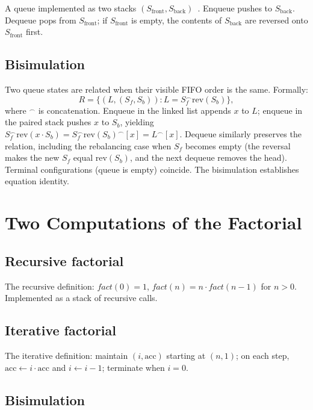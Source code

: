 \documentclass[twocolumn,11pt,a4paper]{article}
\begin{document}
A queue implemented as two stacks $(S_\mathrm{front}, S_\mathrm{back})$~\citep{hood1981queue}. Enqueue pushes to $S_\mathrm{back}$. Dequeue pops from $S_\mathrm{front}$; if $S_\mathrm{front}$ is empty, the contents of $S_\mathrm{back}$ are reversed onto $S_\mathrm{front}$ first.

\subsection{Bisimulation}

Two queue states are related when their visible FIFO order is the same. Formally:
\[
R = \{(L, (S_f, S_b)) : L = S_f ^\frown \mathrm{rev}(S_b)\},
\]
where $^\frown$ is concatenation. Enqueue in the linked list appends $x$ to $L$; enqueue in the paired stack pushes $x$ to $S_b$, yielding $S_f ^\frown \mathrm{rev}(x \cdot S_b) = S_f ^\frown \mathrm{rev}(S_b) ^\frown [x] = L ^\frown [x]$. Dequeue similarly preserves the relation, including the rebalancing case when $S_f$ becomes empty (the reversal makes the new $S_f$ equal $\mathrm{rev}(S_b)$, and the next dequeue removes the head). Terminal configurations (queue is empty) coincide. The bisimulation establishes equation identity.

\section{Two Computations of the Factorial}
\label{sec:factorial-example}

\subsection{Recursive factorial}

The recursive definition: $\mathit{fact}(0) = 1$, $\mathit{fact}(n) = n \cdot \mathit{fact}(n-1)$ for $n > 0$. Implemented as a stack of recursive calls.

\subsection{Iterative factorial}

The iterative definition: maintain $(i, \mathrm{acc})$ starting at $(n, 1)$; on each step, $\mathrm{acc} \gets i \cdot \mathrm{acc}$ and $i \gets i - 1$; terminate when $i = 0$.

\subsection{Bisimulation}
\end{document}
